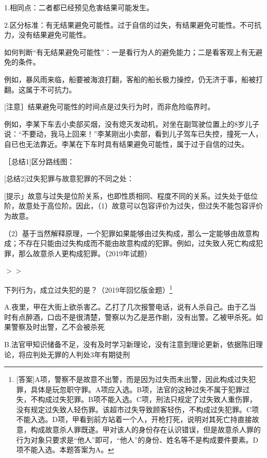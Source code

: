 1.相同点：二者都已经预见危害结果可能发生。

2.区分标准：有无结果避免可能性。过于自信的过失，有结果避免可能性。不可抗力，没有结果避免可能性。

如何判断“有无结果避免可能性”：一是看行为人的避免能力；二是看客观上有无避免的条件。

例如，暴风雨来临，船要被海浪打翻，客船的船长极力操控，仍无济于事，船被打翻。这属于不可抗力。

[注意］结果避免可能性的时间点是过失行为时，而非危险临界时。

例如，李某下车去小卖部买烟，没有熄灭发动机，对坐在副驾驶位置上的8岁儿子说：“不要动，我马上回来！”李某刚出小卖部，看到儿子驾车已失控，撞死一人，自已也无法靠近。李某在下车时具有结果避免可能性，属于过于自信的过失。

［总结1]区分路线图：


[总结2]过失犯罪与故意犯罪的不同之处：


[提示」故意与过失是位阶关系，也即性质相同、程度不同的关系。过失处于低位阶，故意处于高位阶。因此，（1）故意可以包容评价为过失，但过失不能包容评价为故意。

（2）基于当然解释原理，一个犯罪如果能够由过失构成，那么一定能够由故意构成；不存在只能由过失构成而不能由故意构成的犯罪。例如，过失致人死亡构成犯罪，那么故意杀人更构成犯罪。（2019年试题）


\ensuremath{>}\ensuremath{>}

下列行为，成立过失犯的是？（2019年回忆版金题）\footnote{[答案]A项，警察不是故意不出警，而是因为过失而未出警，因此构成过失犯罪，具体是玩忽职守罪。A项应入选。B项，法官的这种过失不属于犯罪过失，不构成过失犯罪。B项不能入选。C项，刑法只规定了过失致人重伤罪，没有规定过失致人轻伤罪。该超市过失导致顾客轻伤，不构成过失犯罪。C项不能入选。D项，甲看到前方站着一个人，开枪打死，说明对其死亡持直接故意，构成故意杀人罪既遂。甲对该人的身份存在认识错误，但是故意杀人罪的行为对象只要求是“他人”即可，“他人”的身份、姓名等不是构成要件要素。D项不能入选。本题答案为A。}

A.夜里，甲在大街上欲杀害乙。乙打了几次报警电话，说有人杀自己。由于乙当时有点醉酒，口齿不是很清楚，警察以为乙是恶作剧，没有出警。乙被甲杀死。如果警察及时出警，乙不会被杀死

B.法官甲知识储备不足，没有及时学习新理论，没有注意到理论更新，依据陈旧理论，将应判处无罪的人判处3年有期徒刑

